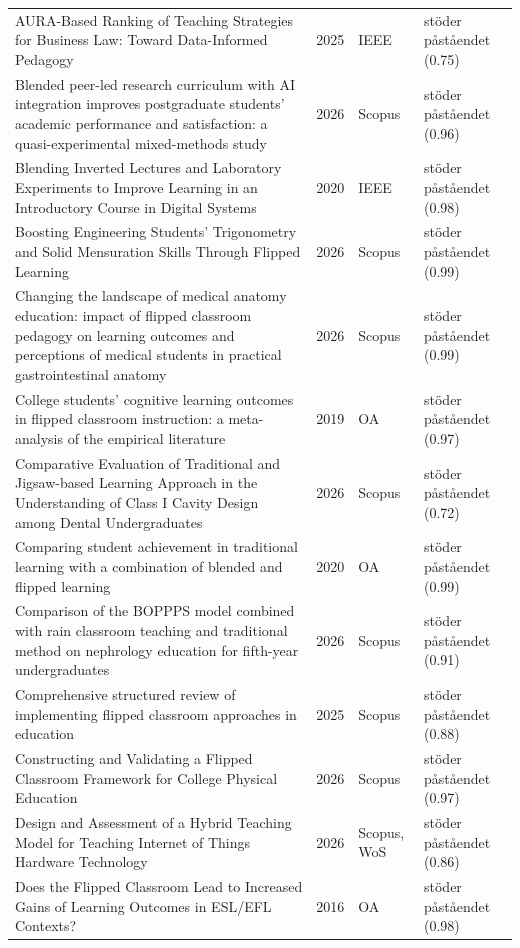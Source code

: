 \begin{longtable}{@{}%
  >{\raggedright\arraybackslash}p{}c%
  >{\raggedright\arraybackslash}p{}%
  >{\raggedright\arraybackslash}p{}@{}}
AURA-Based Ranking of Teaching Strategies for Business Law: Toward Data-Informed Pedagogy & 2025 & IEEE & stöder påståendet (0.75) \\
Blended peer-led research curriculum with AI integration improves postgraduate students' academic performance and satisfaction: a quasi-experimental mixed-methods study & 2026 & Scopus & stöder påståendet (0.96) \\
Blending Inverted Lectures and Laboratory Experiments to Improve Learning in an Introductory Course in Digital Systems & 2020 & IEEE & stöder påståendet (0.98) \\
Boosting Engineering Students' Trigonometry and Solid Mensuration Skills Through Flipped Learning & 2026 & Scopus & stöder påståendet (0.99) \\
Changing the landscape of medical anatomy education: impact of flipped classroom pedagogy on learning outcomes and perceptions of medical students in practical gastrointestinal anatomy & 2026 & Scopus & stöder påståendet (0.99) \\
College students' cognitive learning outcomes in flipped classroom instruction: a meta-analysis of the empirical literature & 2019 & OA & stöder påståendet (0.97) \\
Comparative Evaluation of Traditional and Jigsaw-based Learning Approach in the Understanding of Class I Cavity Design among Dental Undergraduates & 2026 & Scopus & stöder påståendet (0.72) \\
Comparing student achievement in traditional learning with a combination of blended and flipped learning & 2020 & OA & stöder påståendet (0.99) \\
Comparison of the BOPPPS model combined with rain classroom teaching and traditional method on nephrology education for fifth-year undergraduates & 2026 & Scopus & stöder påståendet (0.91) \\
Comprehensive structured review of implementing flipped classroom approaches in education & 2025 & Scopus & stöder påståendet (0.88) \\
Constructing and Validating a Flipped Classroom Framework for College Physical Education & 2026 & Scopus & stöder påståendet (0.97) \\
Design and Assessment of a Hybrid Teaching Model for Teaching Internet of Things Hardware Technology & 2026 & Scopus, WoS & stöder påståendet (0.86) \\
Does the Flipped Classroom Lead to Increased Gains of Learning Outcomes in ESL/EFL Contexts? & 2016 & OA & stöder påståendet (0.98) \\

\end{longtable}
